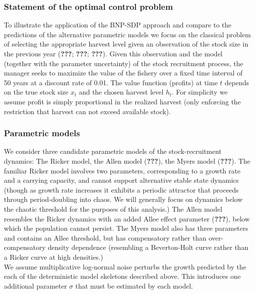 \documentclass[author-year, review]{elsarticle} %
\begin{document}
\subsubsection{Statement of the optimal control
problem}\label{statement-of-the-optimal-control-problem}

To illustrate the application of the BNP-SDP approach and compare to the
predictions of the alternative parametric models we focus on the
classical problem of selecting the appropriate harvest level given an
observation of the stock size in the previous year ({\textbf{???}};
{\textbf{???}}; {\textbf{???}}). Given this observation and the model
(together with the parameter uncertainty) of the stock recruitment
process, the manager seeks to maximize the value of the fishery over a
fixed time interval of 50 years at a discount rate of 0.01. The value
function (profits) at time $t$ depends on the true stock size $x_t$ and
the chosen harvest level $h_t$. For simplicity we assume profit is
simply proportional in the realized harvest (only enforcing the
restriction that harvest can not exceed available stock).

\subsubsection{Parametric models}\label{parametric-models}

We consider three candidate parametric models of the stock-recruitment
dynamics: The Ricker model, the Allen model ({\textbf{???}}), the Myers
model ({\textbf{???}}). The familiar Ricker model involves two
parameters, corresponding to a growth rate and a carrying capacity, and
cannot support alternative stable state dynamics (though as growth rate
increases it exhibits a periodic attractor that proceeds through
period-doubling into chaos. We will generally focus on dynamics below
the chaotic threshold for the purposes of this analysis.) The Allen
model resembles the Ricker dynamics with an added Allee effect parameter
({\textbf{???}}), below which the population cannot persist. The Myers
model also has three parameters and contains an Allee threshold, but has
compensatory rather than over-compensatory density dependence
(resembling a Beverton-Holt curve rather than a Ricker curve at high
densities.)\\We assume multiplicative log-normal noise perturbs the
growth predicted by the each of the deterministic model skeletons
described above. This introduces one additional parameter $\sigma$ that
must be estimated by each model.
\end{document}
